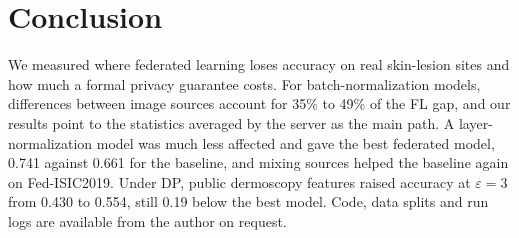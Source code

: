 \documentclass[10pt,twocolumn,a4paper]{article}
\begin{document}
\section{Conclusion}
We measured where federated learning loses accuracy on real skin-lesion sites and how much a formal privacy guarantee costs. For batch-normalization models, differences between image sources account for 35\% to 49\% of the FL gap, and our results point to the statistics averaged by the server as the main path. A layer-normalization model was much less affected and gave the best federated model, 0.741 against 0.661 for the baseline, and mixing sources helped the baseline again on Fed-ISIC2019. Under DP, public dermoscopy features raised accuracy at $\varepsilon = 3$ from 0.430 to 0.554, still 0.19 below the best model. Code, data splits and run logs are available from the author on request.
\end{document}
